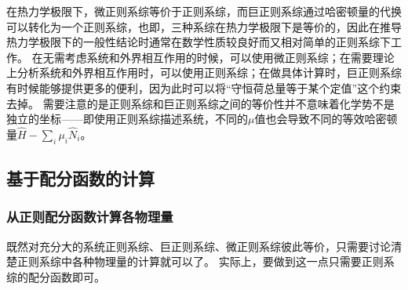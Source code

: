 \documentclass[hyperref, UTF8, a4paper]{ctexart}
\begin{document}
在热力学极限下，微正则系综等价于正则系综，而巨正则系综通过哈密顿量的代换可以转化为一个正则系综，也即，三种系综在热力学极限下是等价的，因此在推导热力学极限下的一般性结论时通常在数学性质较良好而又相对简单的正则系综下工作。
在无需考虑系统和外界相互作用的时候，可以使用微正则系综；在需要理论上分析系统和外界相互作用时，可以使用正则系综；在做具体计算时，巨正则系综有时候能够提供更多的便利，因为此时可以将“守恒荷总量等于某个定值”这个约束去掉。
需要注意的是正则系综和巨正则系综之间的等价性并不意味着化学势不是独立的坐标——即使用正则系综描述系统，不同的$\mu$值也会导致不同的等效哈密顿量$\hat{H}-\sum_i \mu_i \hat{N}_i$。

\subsection{基于配分函数的计算}

\subsubsection{从正则配分函数计算各物理量}\label{sec:calculation-from-canonical-partition}

既然对充分大的系统正则系综、巨正则系综、微正则系综彼此等价，只需要讨论清楚正则系综中各种物理量的计算就可以了。
实际上，要做到这一点只需要正则系综的配分函数即可。
\end{document}
